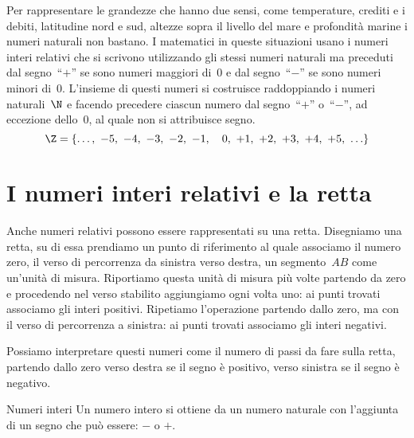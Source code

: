 Per rappresentare le grandezze che hanno due sensi, come temperature, 
crediti e i debiti, latitudine nord e sud, altezze sopra il livello del 
mare e profondità marine i numeri naturali non bastano. 
I matematici in queste situazioni usano i numeri interi relativi che si 
scrivono utilizzando gli stessi numeri naturali ma preceduti dal 
segno~``\(+\)'' se sono numeri maggiori di~0 e dal segno~``\(-\)'' se sono 
numeri minori di~0. L'insieme di questi numeri si costruisce raddoppiando 
i numeri naturali~\(\N\) e facendo precedere ciascun numero dal 
segno~``\(+\)'' o~``\(-\)'',
ad eccezione dello~0, al quale non si attribuisce segno.
\[ \Z=\lbrace\ldots,~ -5,~ -4,~ -3,~ -2,~ -1,~~~0,~ +1,~ +2,~ +3,~ +4,~ +5,~ 
\ldots \rbrace\]

\section{I numeri interi relativi e la retta}
\label{sec:int_retta}

Anche numeri relativi possono essere rappresentati su una retta. 
Disegniamo una retta, su di essa prendiamo un punto di riferimento al quale 
associamo il numero zero, il verso di percorrenza da sinistra verso destra,
un segmento~\(AB\) come un'unità di misura. 
Riportiamo questa unità di misura più volte partendo da zero e procedendo nel 
verso stabilito aggiungiamo ogni volta uno: ai punti trovati associamo gli 
interi positivi.
Ripetiamo l'operazione partendo dallo zero, ma con il verso di percorrenza 
a sinistra: ai punti trovati associamo gli interi negativi.

\begin{center}
\intrappgeo
\end{center}

Possiamo interpretare questi numeri come il numero di passi da fare sulla 
retta, partendo dallo zero verso destra se il segno è positivo, verso 
sinistra se il segno è negativo.


\begin{definizione}{Numeri interi}{}
Un numero intero si ottiene da un numero naturale con l'aggiunta di un segno 
che può essere: \(-\) o \(+\).
\end{definizione}


